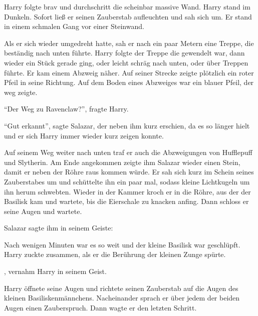 Harry folgte brav und durchschritt die scheinbar massive Wand. Harry stand im Dunkeln. Sofort ließ er seinen Zauberstab aufleuchten und sah sich um. Er stand in einem schmalen Gang vor einer Steinwand.

Als er sich wieder umgedreht hatte, sah er nach ein paar Metern eine Treppe, die beständig nach unten führte. Harry folgte der Treppe die gewendelt war, dann wieder ein Stück gerade ging, oder leicht schräg nach unten, oder über Treppen führte. Er kam einem Abzweig näher. Auf seiner Strecke zeigte plötzlich ein roter Pfeil in seine Richtung.  Auf dem Boden eines Abzweiges war ein blauer Pfeil, der weg zeigte.

\enquote{Der Weg zu Ravenclaw?}, fragte Harry.

\enquote{Gut erkannt}, sagte Salazar, der neben ihm kurz erschien, da es so länger hielt und er sich Harry immer wieder kurz zeigen konnte.

Auf seinem Weg weiter nach unten traf er auch die Abzweigungen von Hufflepuff und Slytherin. Am Ende angekommen zeigte ihm Salazar wieder einen Stein, damit er neben der Röhre raus kommen würde. Er sah sich kurz im Schein seines Zauberstabes um und schüttelte ihn ein paar mal, sodass kleine Lichtkugeln um ihn herum schwebten. Wieder in der Kammer kroch er in die Röhre, aus der der Basilisk kam und wartete, bis die Eierschale zu knacken anfing. Dann schloss er seine Augen und wartete.

Salazar sagte ihm in seinem Geiste: 

Nach wenigen Minuten war es so weit und der kleine Basilisk war geschlüpft. Harry zuckte zusammen, als er die Berührung der kleinen Zunge spürte.





, vernahm Harry in seinem Geist.

Harry öffnete seine Augen und richtete seinen Zauberstab auf die Augen des kleinen Basiliskenmännchens. Nacheinander sprach er über jedem der beiden Augen einen Zauberspruch. Dann wagte er den letzten Schritt.

